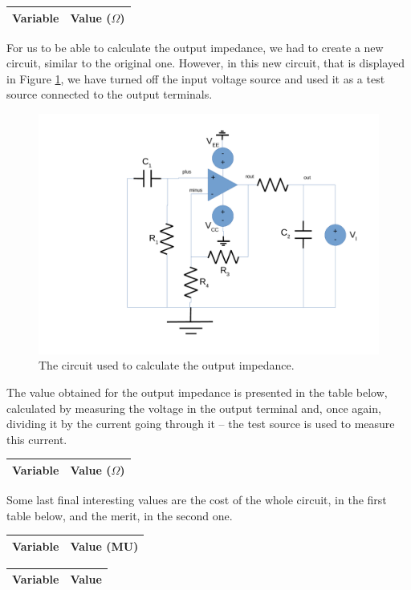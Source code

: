 \begin{center}
\begin{tabular}{|l|r|}
  \hline    
  {\bf Variable} & {\bf Value ($\Omega$)} \\ \hline
  
\end{tabular}
\end{center}

For us to be able to calculate the output impedance, we had to create a new circuit, similar to the original one. However, in this new circuit, that is displayed in Figure \ref{fig:circuit-out}, we have turned off the input voltage source and used it as a test source connected to the output terminals.

\begin{figure}[H] \centering
\includegraphics[width=0.7\linewidth]{circuit-out.pdf}
\caption{The circuit used to calculate the output impedance.}
\label{fig:circuit-out}
\end{figure}

The value obtained for the output impedance is presented in the table below, calculated by measuring the voltage in the output terminal and, once again, dividing it by the current going through it -- the test source is used to measure this current.

\begin{center}
\begin{tabular}{|l|r|}
  \hline    
  {\bf Variable} & {\bf Value ($\Omega$)} \\ \hline
  
\end{tabular}
\end{center}

Some last final interesting values are the cost of the whole circuit, in the first table below, and the merit, in the second one.

\begin{center}
\begin{tabular}{|l|r|}
  \hline    
  {\bf Variable} & {\bf Value (MU)} \\ \hline
  
\end{tabular}
\end{center}

\begin{center}
\begin{tabular}{|l|r|}
  \hline    
  {\bf Variable} & {\bf Value} \\ \hline
  
\end{tabular}
\end{center}